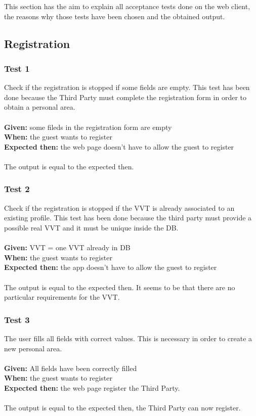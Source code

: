 This section has the aim to explain all acceptance tests done on the web client, the reasons why those tests have been chosen and the obtained output.

\subsection{Registration}

\subsubsection{\Large{Test 1}}
Check if the registration is stopped if some fields are empty. This test has been done because the Third Party must complete the registration form in order to obtain a personal area.\\
\\
\textbf{Given: } some fileds in the registration form are empty\\
\textbf{When: } the guest wants to register\\
\textbf{Expected then: } the web page doesn't have to allow the guest to register\\
\\
The output is equal to the expected then.

\subsubsection{\Large{Test 2}}
Check if the registration is stopped if the VVT is already associated to an existing profile. This test has been done because the third party must provide a possible real VVT and it must be unique inside the DB.\\
\\
\textbf{Given: } VVT = one VVT already in DB\\
\textbf{When: } the guest wants to register\\
\textbf{Expected then: } the app doesn't have to allow the guest to register\\
\\
The output is equal to the expected then. It seems to be that there are no particular requirements for the VVT.

\subsubsection{\Large{Test 3}}
The user fills all fields with correct values. This is necessary in order to create a new personal area.\\
\\
\textbf{Given: } All fields have been correctly filled\\
\textbf{When: } the guest wants to register\\
\textbf{Expected then: } the web page register the Third Party.\\
\\
The output is equal to the expected then, the Third Party can now register.

